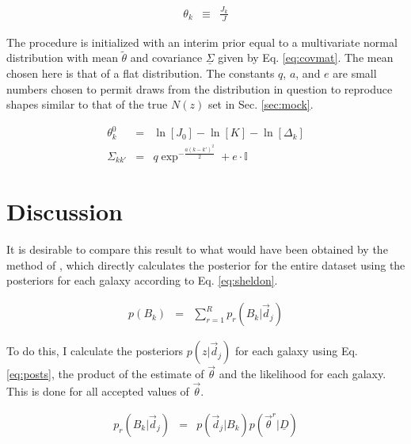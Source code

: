 \documentclass[preprint]{aastex}
\newcommand{\textul}{\underline}
\begin{document}
\begin{eqnarray}
\label{eq:truenz}
\theta_{k} &\equiv& \frac{J_{k}}{J}%
\end{eqnarray}

The procedure is initialized with an interim prior equal to a multivariate normal distribution with mean $\tilde{\theta}$ and covariance $\textul{\Sigma}$ given by Eq. \ref{eq:covmat}.  The mean chosen here is that of a flat distribution.  The constants $q$, $a$, and $e$ are small numbers chosen to permit draws from the distribution in question to reproduce shapes similar to that of the true $N(z)$ set in Sec. \ref{sec:mock}.

\begin{eqnarray}
\label{eq:covmat}
\theta^{0}_{k} &=& \ln[J_{0}]-\ln[K]-\ln[\Delta_{k}]\\
\Sigma_{kk'} &=& q\exp^{-\frac{a(k-k')^{2}}{2}}+e\cdot\mathbb{I}
\end{eqnarray}

\section{Discussion}
\label{sec:disc}

It is desirable to compare this result to what would have been obtained by the method of \citet{she11}, which directly calculates the posterior for the entire dataset using the posteriors for each galaxy according to Eq. \ref{eq:sheldon}.

\begin{eqnarray}
\label{eq:sheldon}
p(B_{k}) &=& \sum_{r=1}^{R}p_{r}(B_{k}|\vec{d}_{j})
\end{eqnarray}

To do this, I calculate the posteriors $p(z|\vec{d}_{j})$ for each galaxy using Eq. \ref{eq:posts}, the product of the estimate of $\vec{\theta}$ and the likelihood for each galaxy.  This is done for all accepted values of $\vec{\theta}$.

\begin{eqnarray}
\label{eq:posts}
p_{r}(B_{k}|\vec{d}_{j}) &=& p(\vec{d}_{j}|B_{k})p(\vec{\theta}^{r}|\textul{D})
\end{eqnarray}

\end{document}
